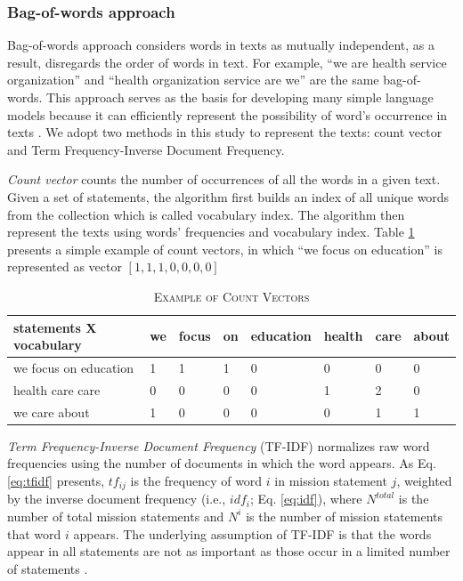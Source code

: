 \documentclass[11pt]{article}
\begin{document}
\subsubsection{Bag-of-words approach}

Bag-of-words approach considers words in texts as mutually independent, as a result, disregards the order of words in text. For example, ``we are health service organization'' and ``health organization service are we'' are the same bag-of-words. This approach serves as the basis for developing many simple language models because it can efficiently represent the possibility of word's occurrence in texts \parencite{BengfortAppliedTextAnalysis2018}. We adopt two methods in this study to represent the texts: count vector and Term Frequency-Inverse Document Frequency.

\textit{Count vector} counts the number of occurrences of all the words in a given text. Given a set of statements, the algorithm first builds an index of all unique words from the collection which is called vocabulary index. The algorithm then represent the texts using words' frequencies and vocabulary index. Table \ref{tab:count_vector} presents a simple example of count vectors, in which ``we focus on education'' is represented as vector $[1, 1, 1, 0, 0, 0, 0]$

\begin{table}
\caption{\textsc{Example of Count Vectors}} \label{tab:count_vector}
\begin{tabular}{m{3.9cm}|m{0.9cm}|m{1cm}|m{0.9cm}|m{1.5cm}|m{1cm}|m{1cm}|m{0.8cm}}
    \hline
    statements X vocabulary & we & focus & on & education & health & care & about \\
    \hline
    we focus on education & 1 & 1 & 1 & 0 & 0 & 0 & 0 \\ 
    \hdashline
    health care care  & 0 & 0 & 0 & 0 & 1 & 2 & 0 \\ 
    \hdashline
    we care about & 1 & 0 & 0 & 0 & 0 & 1 & 1 \\ 
    \hline
\end{tabular}
\end{table}

\textit{Term Frequency-Inverse Document Frequency} (TF-IDF) normalizes raw word frequencies using the number of documents in which the word appears. As Eq. \ref{eq:tfidf} presents, $tf_{ij}$ is the frequency of word $i$ in mission statement $j$, weighted by the inverse document frequency (i.e., $idf_i$; Eq. \ref{eq:idf}), where $N^{total}$ is the number of total mission statements and $N^{i}$ is the number of mission statements that word $i$ appears. The underlying assumption of TF-IDF is that the words appear in all statements are not as important as those occur in a limited number of statements \parencite[278]{JurafskySpeechLanguageProcessing2017}.
\end{document}

